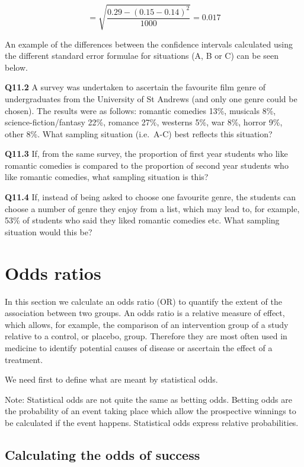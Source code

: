 \documentclass[
  oneside]{krantz}
\begin{document}
\[= \sqrt{\frac{0.29 - (0.15-0.14)^2}{1000}} = 0.017 \]

An example of the differences between the confidence intervals calculated using the different standard error formulae for situations (A, B or C) can be seen below.

\textbf{Q11.2} A survey was undertaken to ascertain the favourite film genre of undergraduates from the University of St Andrews (and only one genre could be chosen). The results were as follows: romantic comedies 13\%, musicals 8\%, science-fiction/fantasy 22\%, romance 27\%, westerns 5\%, war 8\%, horror 9\%, other 8\%. What sampling situation (i.e.~A-C) best reflects this situation?

\textbf{Q11.3} If, from the same survey, the proportion of first year students who like romantic comedies is compared to the proportion of second year students who like romantic comedies, what sampling situation is this?

\textbf{Q11.4} If, instead of being asked to choose one favourite genre, the students can choose a number of genre they enjoy from a list, which may lead to, for example, 53\% of students who said they liked romantic comedies etc. What sampling situation would this be?

\hypertarget{odds-ratios}{%
\section{Odds ratios}\label{odds-ratios}}

In this section we calculate an odds ratio (OR) to quantify the extent of the association between two groups. An odds ratio is a relative measure of effect, which allows, for example, the comparison of an intervention group of a study relative to a control, or placebo, group. Therefore they are most often used in medicine to identify potential causes of disease or ascertain the effect of a treatment.

We need first to define what are meant by statistical odds.

Note: Statistical odds are not quite the same as betting odds. Betting odds are the probability of an event taking place which allow the prospective winnings to be calculated if the event happens. Statistical odds express relative probabilities.

\hypertarget{calculating-the-odds-of-success}{%
\subsection{Calculating the odds of success}\label{calculating-the-odds-of-success}}
\end{document}

